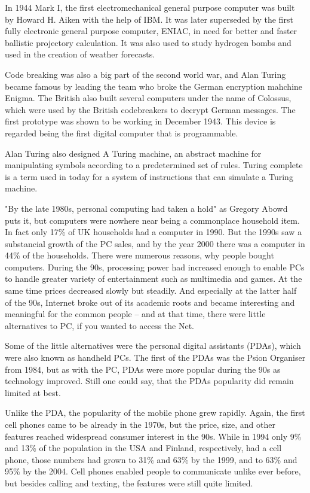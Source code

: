 \documentclass[a4paper,12pt]{article}
\begin{document}
In 1944 Mark I, the first electromechanical general purpose computer was built by Howard H. Aiken with the help of IBM. It was later superseded by the first fully electronic general purpose computer, ENIAC, in need for better and faster ballistic projectory calculation. It was also used to study hydrogen bombs and used in the creation of weather forecasts.

Code breaking was also a big part of the second world war, and Alan Turing became famous by leading the team who broke the German encryption mahchine Enigma. The British also built several computers under the name of Colossus, which were used by the British codebreakers to decrypt German messages. The first prototype was shown to be working in December 1943. This device is regarded being the first digital computer that is programmable.

Alan Turing also designed A Turing machine, an abstract machine for manipulating symbols according to a predetermined set of rules. Turing complete is a term used in today for a system of instructions that can simulate a Turing machine.

"By the late 1980s, personal computing had taken a hold" as Gregory Abowd puts it\cite{gda}, but computers were nowhere near being a commonplace household item. In fact only 17\% of UK households had a computer in 1990\cite{stat}. But the 1990s saw a substancial growth of the PC sales, and by the year 2000 there was a computer in 44\% of the households\cite{stat}. There were numerous reasons, why people bought computers. During the 90s, processing power had increased enough to enable PCs to handle greater variety of entertainment such as multimedia and games. At the same time prices decreased slowly but steadily. And especially at the latter half of the 90s, Internet broke out of its academic roots and became interesting and meaningful for the common people -- and at that time, there were little alternatives to PC, if you wanted to access the Net.

Some of the little alternatives were the personal digital assistants (PDAs), which were also known as handheld PCs. The first of the PDAs was the Psion Organiser from 1984, but as with the PC, PDAs were more popular during the 90s as technology improved. Still one could say, that the PDAs popularity did remain limited at best.

Unlike the PDA, the popularity of the mobile phone grew rapidly. Again, the first cell phones came to be already in the 1970s, but the price, size, and other features reached widespread consumer interest in the 90s. While in 1994 only 9\% and 13\% of the population in the USA and Finland, respectively, had a cell phone, those numbers had grown to 31\% and 63\% by the 1999, and to 63\% and 95\% by the 2004\cite{sy15}. Cell phones enabled people to communicate unlike ever before, but besides calling and texting, the features were still quite limited.
\end{document}
